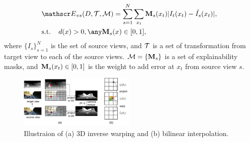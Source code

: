 \begin{align}
\label{eqn:warp}
&\scr{E}_{vs}(D, \hua{T}, \hua{M}) = \sum_{s=1}^{N}\sum_{x_t}\ve{M}_s(x_t)|I_t(x_t) - \hat{I_s}(x_t)|, \\
&\text{s.t. ~~} d(x) > 0, \any \ve{M}_s(x)\in [0, 1],
\end{align}
where $\{I_s\}_{s=1}^{N}$ is the set of source views, and ${\mathcal T}$ is a set of transformation from target view to each of the source views. 
${\mathcal M} = \{{\mathbf M}_s\}$ is a set of explainability masks, and ${\mathbf M}_s(x_t) \in [0, 1]$ is the weight to add error at $x_t$ from source view $s$.

\begin{figure}
\centering
\includegraphics[width=0.5\textwidth]{figures/3d_warping.pdf}
\caption{Illustraion of (a) 3D inverse warping and (b) bilinear interpolation.}
\label{fig:3d_warping}
\end{figure}


